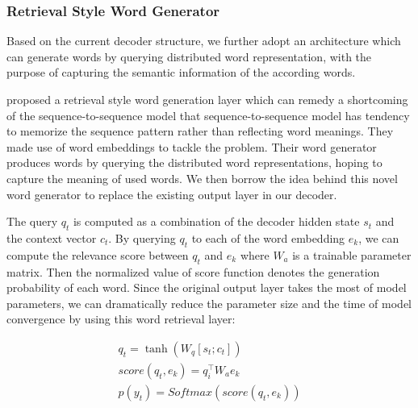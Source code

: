 \documentclass[letterpaper]{article} %
\begin{document}
\subsubsection{Retrieval Style Word Generator}
Based on the current decoder structure, we further adopt an architecture which can generate words by querying distributed word representation, with the purpose of capturing the semantic information of the according words.

\cite{ma2018query} proposed a retrieval style word generation layer which can remedy a shortcoming of the sequence-to-sequence model that sequence-to-sequence model has tendency to memorize the sequence pattern rather than reflecting word meanings. They made use of word embeddings to tackle the problem. Their word generator produces words by querying the distributed word representations, hoping to capture the meaning of used words. We then borrow the idea behind this novel word generator to replace the existing output layer in our decoder.

The query \(q_t\) is computed as a combination of the decoder hidden state \(s_t\) and the context vector \(c_t\). By querying \(q_t\) to each of the word embedding \(e_k\), we can compute the relevance score between \(q_t\) and \(e_k\) where \(W_a\) is a trainable parameter matrix. Then the normalized value of score function denotes the generation probability of each word. Since the original output layer takes the most of model parameters, we can dramatically reduce the parameter size and the time of model convergence by using this word retrieval layer:

\begin{gather}
q_t = \tanh(W_q[s_t;c_t]) \label{eq_18} \\
score(q_t, e_k) = q^\top_iW_ae_k \label{eq_19} \\
p(y_t) = Softmax(score(q_t, e_k)) \label{eq_20}
\end{gather}
\end{document}
